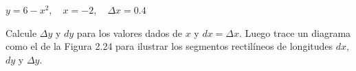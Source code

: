 \item $y = 6 - x^2, \quad x = -2, \quad \Delta x = 0.4$
\par
Calcule $\Delta y$ y $dy$ para los valores dados de $x$ y $dx = \Delta x$. Luego trace un diagrama como el de la Figura 2.24 para ilustrar los segmentos rectilíneos de longitudes $dx$, $dy$ y $\Delta y$.
